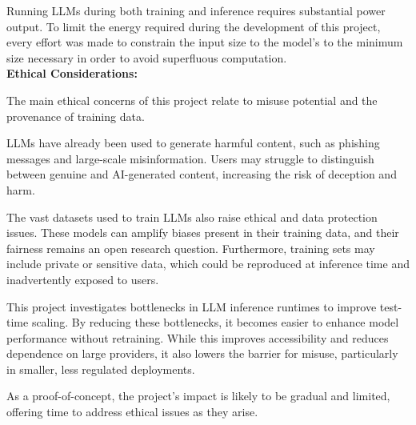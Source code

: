 \documentclass[11pt,twoside]{report}
\begin{document}
Running LLMs during both training and inference requires substantial power output.
To limit the energy required during the development of this project, every effort was made to constrain the input size to the model's to the minimum size necessary in order to avoid superfluous computation. \\

\textbf{Ethical Considerations:}

The main ethical concerns of this project relate to misuse potential and the provenance of training data.

LLMs have already been used to generate harmful content, such as phishing messages and large-scale misinformation. 
Users may struggle to distinguish between genuine and AI-generated content, increasing the risk of deception and harm.

The vast datasets used to train LLMs also raise ethical and data protection issues. 
These models can amplify biases present in their training data, and their fairness remains an open research question. 
Furthermore, training sets may include private or sensitive data, which could be reproduced at inference time and inadvertently exposed to users.

This project investigates bottlenecks in LLM inference runtimes to improve test-time scaling. 
By reducing these bottlenecks, it becomes easier to enhance model performance without retraining. 
While this improves accessibility and reduces dependence on large providers, it also lowers the barrier for misuse, particularly in smaller, less regulated deployments.

As a proof-of-concept, the project’s impact is likely to be gradual and limited, offering time to address ethical issues as they arise.
\end{document}
